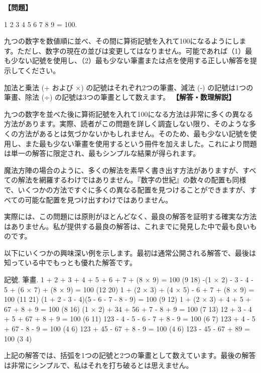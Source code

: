 \documentclass[10pt,a4paper,oneside,openany]{ltjsbook}
\begin{document}
\begin{tcolorbox}[colback=softblue,colframe=primaryblue,title=\textbf{第 94 問：数字の世紀 （原題: THE DIGITAL CENTURY.）},arc=2mm,boxrule=1pt,breakable]
\textbf{【問題】}\par\vspace{0.3em}
1 2 3 4 5 6 7 8 9 = 100.

九つの数字を数値順に並べ、その間に算術記號を入れて100になるようにします。ただし、数字の現在の並びは変更してはなりません。可能であれば（1）最も少ない記號を使用し、（2）最も少ない筆畫または点を使用する正しい解答を提示してください。

加法と乗法 (+ および ×) の記號はそれぞれ2つの筆畫、減法 (-) の記號は1つの筆畫、除法 (÷) の記號は3つの筆畫として数えます。
\tcblower
\textbf{【解答・数理解説】}\par\vspace{0.3em}
九つの数字を並べた後に算術記號を入れて100になる方法は非常に多くの異なる方法があります。実際、読者がこの問題を詳しく調査しない限り、そのような多くの方法があるとは気づかないかもしれません。そのため、最も少ない記號を使用し、また最も少ない筆畫を使用するという冊件を加えました。これにより問題は単一の解答に限定され、最もシンプルな結果が得られます。

魔法方陣の場合のように、多くの解法を素早く書き出す方法がありますが、すべての解法を網羅するわけではありません。『数字の世紀』の数々の配置も同様で、いくつかの方法ですぐに多くの異なる配置を見つけることができますが、すべての可能な配置を見つけ出すわけではありません。

実際には、この問題には原則がほとんどなく、最良の解答を証明する確実な方法はありません。私が提供する最良の解答は、これまでに発見した中で最も良いものです。

以下にいくつかの興味深い例を示します。最初は通常公開される解答で、最後は知っている中でもっとも優れた解答です。

記號. 筆畫.
1 + 2 + 3 + 4 + 5 + 6 + 7 + (8 × 9) = 100 (9 18)
-(1 × 2) - 3 - 4 - 5 + (6 × 7) + (8 × 9) = 100 (12 20)
1 + (2 × 3) + (4 × 5) - 6 + 7 + (8 × 9) = 100 (11 21)
(1 + 2 - 3 - 4)(5 - 6 - 7 - 8 - 9) = 100 (9 12)
1 + (2 × 3) + 4 + 5 + 67 + 8 + 9 = 100 (8 16)
(1 × 2) + 34 + 56 + 7 - 8 + 9 = 100 (7 13)
12 + 3 - 4 + 5 + 67 + 8 + 9 = 100 (6 11)
123 - 4 - 5 - 6 - 7 + 8 - 9 = 100 (6 7)
123 + 4 - 5 + 67 - 8 - 9 = 100 (4 6)
123 + 45 - 67 + 8 - 9 = 100 (4 6)
123 - 45 - 67 + 89 = 100 (3 4)

上記の解答では、括弧を1つの記號と2つの筆畫として数えています。最後の解答は非常にシンプルで、私はそれを打ち破るとは思えません。
\end{tcolorbox}
\end{document}
